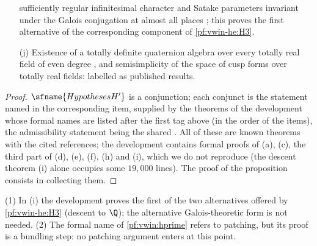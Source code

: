 \begin{proposition}
\begin{enumerate}
sufficiently regular infinitesimal character and Satake parameters invariant under the Galois conjugation at almost all
places \cite{Langlands1980}; this proves the first alternative of the corresponding component of \ref{pf:vwin-he:H3}.
\item[(j)] Existence of a totally definite quaternion algebra over every totally real field of even degree
\cite{Vigneras1980}, and semisimplicity of the space of cusp forms over totally real fields: labelled as published
results.
\end{enumerate}
\end{proposition}

\begin{proof}
$\sfname{HypothesesH'}$ is a conjunction; each conjunct is the statement named in the corresponding item, supplied by
the theorems of the development whose formal names are listed after the first tag above (in the order of the items),
the admissibility statement being the shared . All of these are known
theorems with the cited references; the development contains formal proofs of (a), (c), the third part of (d), (e),
(f), (h) and (i), which we do not reproduce (the descent theorem (i) alone occupies some $19{,}000$ lines). The proof of
the proposition consists in collecting them.
\end{proof}

\begin{remark}\label{pf:vwin:rem-hprime}
(1) In (i) the development proves the first of the two alternatives offered by \ref{pf:vwin-he:H3} (descent to $\Q$);
the alternative Galois-theoretic form is not needed. (2) The formal name of \cref{pf:vwin:hprime} refers to patching,
but its proof is a bundling step: no patching argument enters at this point.
\end{remark}


